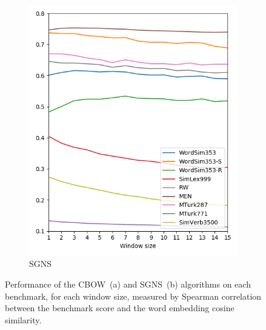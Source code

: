 \documentclass[11pt,a4paper]{article}
\begin{document}
\begin{figure}[th]
\begin{subfigure}[b]{\columnwidth}
        \includegraphics[width=\columnwidth]{figs/similarities_fasttext_enwiki-20170501-clean_skipgram-300d-min500_eval.png}
        \caption{SGNS}
        \end{subfigure}
        \caption{Performance of the CBOW~(a) and SGNS~(b) algorithms on each benchmark,
        for each window size,
        measured by Spearman correlation between the benchmark score
        and the word embedding cosine similarity.
        \label{fig:benchmark_correlation}}
    \end{figure}
    
\end{document}
